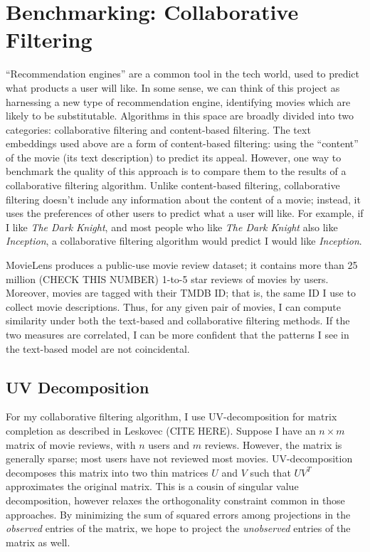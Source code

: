 \documentclass{article}
\begin{document}
\section{Benchmarking: Collaborative Filtering}

``Recommendation engines'' are a common tool in the tech world, used to predict what products a user will like. In some sense, we can think of this project as harnessing a new type of recommendation engine, identifying movies which are likely to be substitutable. Algorithms in this space are broadly divided into two categories: collaborative filtering and content-based filtering. The text embeddings used above are a form of content-based filtering: using the ``content'' of the movie (its text description) to predict its appeal. However, one way to benchmark the quality of this approach is to compare them to the results of a collaborative filtering algorithm. Unlike content-based filtering, collaborative filtering doesn't include any information about the content of a movie; instead, it uses the preferences of other users to predict what a user will like. For example, if I like \emph{The Dark Knight}, and most people who like \emph{The Dark Knight} also like \emph{Inception}, a collaborative filtering algorithm would predict I would like \emph{Inception}. 

MovieLens produces a public-use movie review dataset; it contains more than 25 million (CHECK THIS NUMBER) 1-to-5 star reviews of movies by users. Moreover, movies are tagged with their TMDB ID; that is, the same ID I use to collect movie descriptions. Thus, for any given pair of movies, I can compute similarity under both the text-based and collaborative filtering methods. If the two measures are correlated, I can be more confident that the patterns I see in the text-based model are not coincidental.

\subsection{UV Decomposition}

For my collaborative filtering algorithm, I use UV-decomposition for matrix completion as described in Leskovec (CITE HERE). Suppose I have an $n \times m$ matrix of movie reviews, with $n$ users and $m$ reviews. However, the matrix is generally sparse; most users have not reviewed most movies. UV-decomposition decomposes this matrix into two thin matrices $U$ and $V$ such that $UV^T$ approximates the original matrix. This is a cousin of singular value decomposition, however relaxes the orthogonality constraint common in those approaches. By minimizing the sum of squared errors among projections in the \emph{observed} entries of the matrix, we hope to project the \emph{unobserved} entries of the matrix as well.
\end{document}
